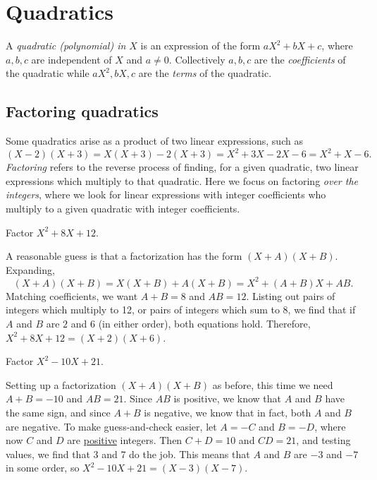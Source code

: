 \section{Quadratics}

A \emph{quadratic (polynomial) in $X$} is an expression of the form $aX^2 + bX + c$, where $a,b,c$ are independent of $X$ and $a\neq 0$. Collectively $a,b,c$ are the \emph{coefficients} of the quadratic while $aX^2, bX, c$ are the \emph{terms} of the quadratic.

\subsection{Factoring quadratics}

Some quadratics arise as a product of two linear expressions, such as
\begin{equation*}
(X - 2)(X + 3) = X(X + 3) - 2(X + 3) = X^2 + 3X - 2X - 6 = X^2 + X - 6. 
\end{equation*}
\emph{Factoring} refers to the reverse process of finding, for a given quadratic, two linear expressions which multiply to that quadratic. Here we focus on factoring \emph{over the integers}, where we look for linear expressions with integer coefficients who multiply to a given quadratic with integer coefficients.

\begin{example}
Factor $X^2 + 8X + 12$.
\end{example}
\begin{solution}
A reasonable guess is that a factorization has the form $(X + A)(X + B)$. Expanding,
\begin{equation*}
(X + A)(X + B) = X(X + B) + A(X + B) = X^2 + (A + B)X + AB.
\end{equation*}
Matching coefficients, we want $A + B = 8$ and $AB = 12$. Listing out pairs of integers which multiply to 12, or pairs of integers which sum to 8, we find that if $A$ and $B$ are $2$ and $6$ (in either order), both equations hold. Therefore, $X^2 + 8X + 12 = \boxed{(X + 2)(X + 6)}$.
\end{solution}

\begin{example}
Factor $X^2 - 10X + 21$.
\end{example}
\begin{solution}
Setting up a factorization $(X + A)(X + B)$ as before, this time we need $A + B = -10$ and $AB = 21$. Since $AB$ is positive, we know that $A$ and $B$ have the same sign, and since $A + B$ is negative, we know that in fact, both $A$ and $B$ are negative. To make guess-and-check easier, let $A = -C$ and $B = -D$, where now $C$ and $D$ are \underline{positive} integers. Then $C + D = 10$ and $CD = 21$, and testing values, we find that 3 and 7 do the job. This means that $A$ and $B$ are $-3$ and $-7$ in some order, so $X^2 - 10X + 21 = \boxed{(X - 3)(X - 7)}$.
\end{solution}

